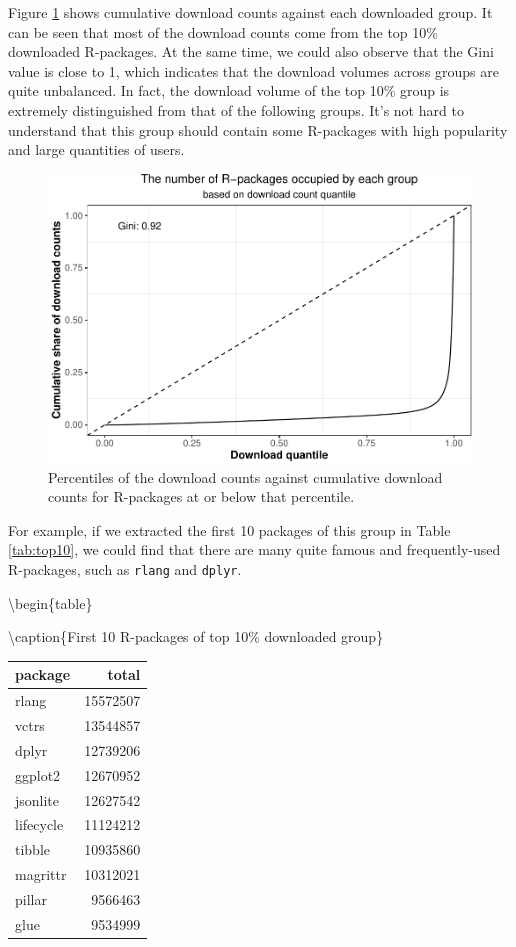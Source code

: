 \documentclass[
]{book}
\begin{document}
Figure \ref{fig:lorenz-all} shows cumulative download counts against each downloaded group. It can be seen that most of the download counts come from the top 10\% downloaded R-packages. At the same time, we could also observe that the Gini value is close to 1, which indicates that the download volumes across groups are quite unbalanced. In fact, the download volume of the top 10\% group is extremely distinguished from that of the following groups. It's not hard to understand that this group should contain some R-packages with high popularity and large quantities of users.



\begin{figure}

{\centering \includegraphics{figures/lorenz-all-1} 

}

\caption{Percentiles of the download counts against cumulative download counts for R-packages at or below that percentile.}\label{fig:lorenz-all}
\end{figure}

For example, if we extracted the first 10 packages of this group in Table \ref{tab:top10}, we could find that there are many quite famous and frequently-used R-packages, such as \texttt{rlang} and \texttt{dplyr}.

\textbackslash begin\{table\}

\textbackslash caption\{\label{tab:top10}First 10 R-packages of top 10\% downloaded group\}
\centering

\begin{tabular}[t]{l|r}
\hline
package & total\\
\hline
rlang & 15572507\\
\hline
vctrs & 13544857\\
\hline
dplyr & 12739206\\
\hline
ggplot2 & 12670952\\
\hline
jsonlite & 12627542\\
\hline
lifecycle & 11124212\\
\hline
tibble & 10935860\\
\hline
magrittr & 10312021\\
\hline
pillar & 9566463\\
\hline
glue & 9534999\\
\hline
\end{tabular}
\end{document}
